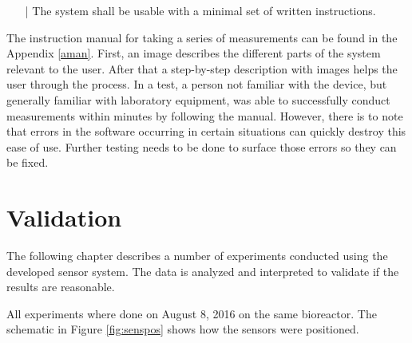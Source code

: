 \begin{itemize}
\item[|] The system shall be usable with a minimal set of written instructions.\\
\end{itemize}

The instruction manual for taking a series of measurements can be found in the Appendix \ref{aman}. First, an image describes the different parts of the system relevant to the user. After that a step-by-step description with images helps the user through the process. In a test, a person not familiar with the device, but generally familiar with laboratory equipment, was able to successfully conduct measurements within minutes by following the manual. However, there is to note that errors in the software occurring in certain situations can quickly destroy this ease of use. Further testing needs to be done to surface those errors so they can be fixed.

\section{Validation} \label{val}

The following chapter describes a number of experiments conducted using the developed sensor system. The data is analyzed and interpreted to validate if the results are reasonable. 

All experiments where done on August 8, 2016 on the same bioreactor. The schematic in Figure \ref{fig:senspos} shows how the sensors were positioned.

